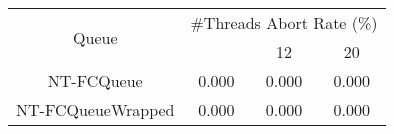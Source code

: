 \begin{tabular}{|c|c|c|c|}
\hline
\multirow{2}{*}{Queue} & \multicolumn{3}{c|}{\#Threads Abort Rate (\%)}\\\cline{2-4}& \quad 4 & 12 & 20\\
\hline
\hline
NT-FCQueue & 0.000 & 0.000 & 0.000\\
NT-FCQueueWrapped & 0.000 & 0.000 & 0.000\\
\hline\end{tabular}
